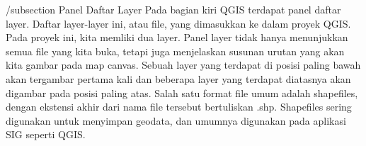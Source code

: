 /subsection {Panel Daftar Layer}
    Pada bagian kiri QGIS terdapat panel daftar layer. Daftar layer-layer ini, atau file, yang dimasukkan ke dalam proyek QGIS. Pada proyek ini, kita memliki dua layer.
    Panel layer tidak hanya menunjukkan semua file yang kita buka, tetapi juga menjelaskan susunan urutan yang akan kita gambar pada map canvas. Sebuah layer yang terdapat di posisi paling bawah akan tergambar pertama kali dan beberapa layer yang terdapat diatasnya akan digambar pada posisi paling atas.
    Salah satu format file umum adalah shapefiles, dengan ekstensi akhir dari nama file tersebut bertuliskan .shp. Shapefiles sering digunakan untuk menyimpan geodata, dan umumnya digunakan pada aplikasi SIG seperti QGIS.
